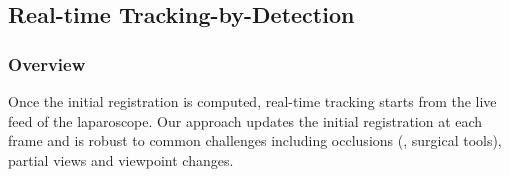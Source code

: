 
\subsection{Real-time Tracking-by-Detection}
\label{sec:updateRegistration}
\subsubsection{Overview}
Once the initial registration is computed,  real-time tracking starts from the live feed of the laparoscope. 
Our approach updates the initial registration at each frame and is robust to common challenges including occlusions (\eg, surgical tools), partial views and viewpoint changes.


